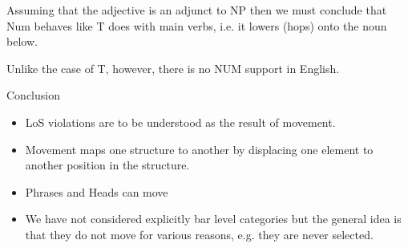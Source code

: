 \begin{frame}
  Assuming that the adjective is an adjunct to NP then we must conclude that Num behaves like T does with main verbs, i.e. it lowers (hops) onto the noun below.  

Unlike the case of T, however, there is no NUM support in English.
\end{frame}


\begin{frame}
  {Conclusion}
\begin{itemize}
\item LoS violations are to be understood as the result of movement.
\item Movement maps one structure to another by displacing one element to another position in the structure.
\item Phrases and Heads can move
\item We have not considered explicitly bar level categories but the general idea is that they do not move for various reasons, e.g. they are never selected.
\end{itemize}

\end{frame}






